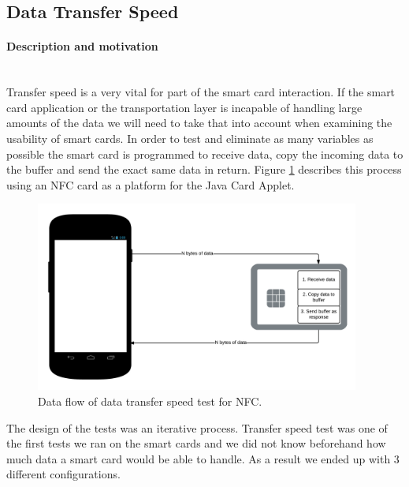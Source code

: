 \subsection{Data Transfer Speed}
\paragraph{Description and motivation}\mbox{}\\
Transfer speed is a very vital for part of the smart card interaction. If the smart card application or the transportation layer is incapable of handling large amounts of the data we will need to take that into account when examining the usability of smart cards. In order to test and eliminate as many variables as possible the smart card is programmed to receive data, copy the incoming data to the buffer and send the exact same data in return. Figure \ref{fig:nfcDataflowTest} describes this process using an NFC card as a platform for the Java Card Applet.

\begin{figure}[h!]
  \caption{Data flow of data transfer speed test for NFC.}
  \label{fig:nfcDataflowTest}
  \centering
    \includegraphics[width=0.95\textwidth]{images/NFCTransferTest.png}
\end{figure}

The design of the tests was an iterative process. Transfer speed test was one of the first tests we ran on the smart cards and we did not know beforehand how much data a smart card would be able to handle. As a result we ended up with 3 different configurations.

